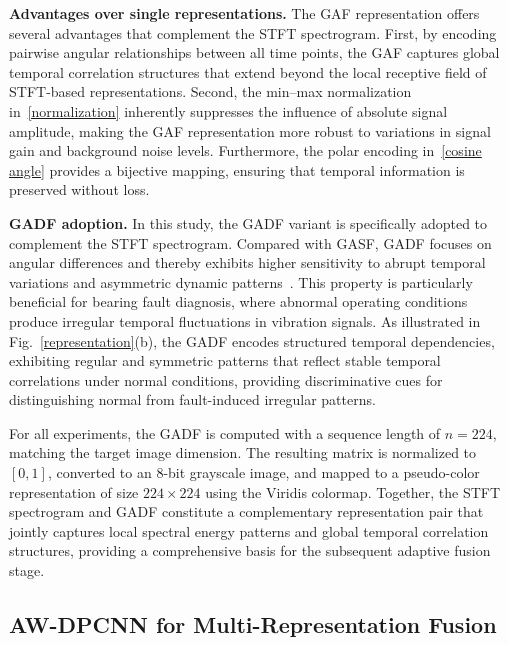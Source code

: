 \documentclass[journal]{IEEEtran}
\begin{document}
\textbf{Advantages over single representations.} The GAF representation offers several advantages that complement the STFT spectrogram. First, by encoding pairwise angular relationships between all time points, the GAF captures global temporal correlation structures that extend beyond the local receptive field of STFT-based representations. Second, the min--max normalization in~\eqref{normalization} inherently suppresses the influence of absolute signal amplitude, making the GAF representation more robust to variations in signal gain and background noise levels. Furthermore, the polar encoding in~\eqref{cosine angle} provides a bijective mapping, ensuring that temporal information is preserved without loss.

\textbf{GADF adoption.} In this study, the GADF variant is specifically adopted to complement the STFT spectrogram. Compared with GASF, GADF focuses on angular differences and thereby exhibits higher sensitivity to abrupt temporal variations and asymmetric dynamic patterns~\cite{11278186}. This property is particularly beneficial for bearing fault diagnosis, where abnormal operating conditions produce irregular temporal fluctuations in vibration signals. As illustrated in Fig.~\ref{representation}(b), the GADF encodes structured temporal dependencies, exhibiting regular and symmetric patterns that reflect stable temporal correlations under normal conditions, providing discriminative cues for distinguishing normal from fault-induced irregular patterns.

For all experiments, the GADF is computed with a sequence length of $n = 224$, matching the target image dimension. The resulting matrix is normalized to $[0, 1]$, converted to an 8-bit grayscale image, and mapped to a pseudo-color representation of size $224 \times 224$ using the Viridis colormap. Together, the STFT spectrogram and GADF constitute a complementary representation pair that jointly captures local spectral energy patterns and global temporal correlation structures, providing a comprehensive basis for the subsequent adaptive fusion stage.

\subsection{AW-DPCNN for Multi-Representation Fusion}
\label{sec:awdpcnn}
\end{document}
